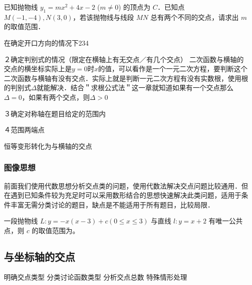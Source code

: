 \documentclass[lang=cn, 10pt, titlestyle=display, oneside, toc=twocol]{elegantbook}
\begin{document}
\begin{example}
已知抛物线 \( y_1 = mx^2 + 4x - 2 \) (\( m \neq 0 \)) 的顶点为 \( C \)．已知点 \( M(-1, -4), N(3, 0) \)，若该抛物线与线段 \( MN \) 总有两个不同的交点，请求出 \( m \) 的取值范围．
\end{example}




在确定开口方向的情况下234

２确定判别式的情况（限定在横轴上有无交点／有几个交点）
二次函数与横轴的交点的横坐标实际上是\(y=0\)时\(x\)的值，可以看作是一个一元二次方程，要判断这个二次函数与横轴有没有交点．实际上就是判断一元二次方程有没有实数根，使用根的判别式\(\Delta\)就能解决．结合＂求根公式法＂这一章就知道如果有一个交点那么\(\Delta=0\)，如果有两个交点，则\(\Delta>0\)



３确定对称轴在题目给定的范围内


４范围两端点




恒等变形转化为与横轴的交点






\subsubsection*{图像思想}

前面我们使用代数思想分析交点类的问题，使用代数法解决交点问题比较通用．但在遇到已知条件较为充足时可以采用数形结合的思想快速解决此类问题，适用于条件丰富无需分类讨论的题目，缺点是不能适用于所有题目，比较局限．

\begin{example}
一段抛物线 \( L: y = -x (x-3) + c \)\( (0 \leq x \leq 3) \) 与直线 \( l: y = x + 2 \) 有唯一公共点，则 \( c \) 的取值范围为\underline{\hspace{4em}}。
\end{example}

\subsection{与坐标轴的交点}
明确交点类型
分类讨论函数类型
分析交点总数
特殊情形处理
\end{document}
